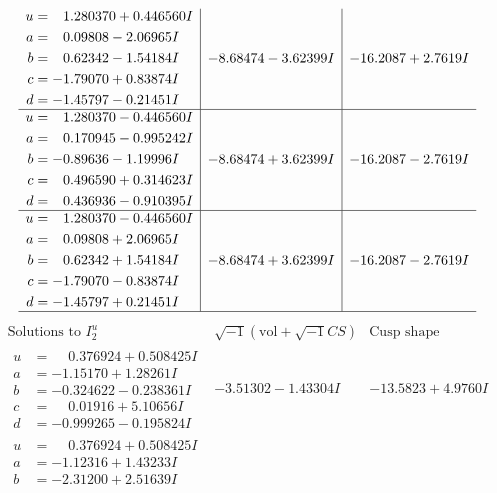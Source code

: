\documentclass[1p]{elsarticle_modified}
\theoremstyle{definition}
\newcommand{\I}{\sqrt{-1}}
\begin{document}
$$\begin{array}{c|c|c}
\begin{aligned}
u &= \phantom{-}1.280370 + 0.446560 I \\
a &= \phantom{-}0.09808 - 2.06965 I \\
b &= \phantom{-}0.62342 - 1.54184 I \\
c &= -1.79070 + 0.83874 I \\
d &= -1.45797 - 0.21451 I\end{aligned}
 & -8.68474 - 3.62399 I & -16.2087 + 2.7619 I \\ \hline\begin{aligned}
u &= \phantom{-}1.280370 - 0.446560 I \\
a &= \phantom{-}0.170945 - 0.995242 I \\
b &= -0.89636 - 1.19996 I \\
c &= \phantom{-}0.496590 + 0.314623 I \\
d &= \phantom{-}0.436936 - 0.910395 I\end{aligned}
 & -8.68474 + 3.62399 I & -16.2087 - 2.7619 I \\ \hline\begin{aligned}
u &= \phantom{-}1.280370 - 0.446560 I \\
a &= \phantom{-}0.09808 + 2.06965 I \\
b &= \phantom{-}0.62342 + 1.54184 I \\
c &= -1.79070 - 0.83874 I \\
d &= -1.45797 + 0.21451 I\end{aligned}
 & -8.68474 + 3.62399 I & -16.2087 - 2.7619 I\\
 \hline 
 \end{array}$$\newpage$$\begin{array}{c|c|c}  
\text{Solutions to }I^u_{2}& \I (\text{vol} + \sqrt{-1}CS) & \text{Cusp shape}\\
 \hline 
\begin{aligned}
u &= \phantom{-}0.376924 + 0.508425 I \\
a &= -1.15170 + 1.28261 I \\
b &= -0.324622 - 0.238361 I \\
c &= \phantom{-}0.01916 + 5.10656 I \\
d &= -0.999265 - 0.195824 I\end{aligned}
 & -3.51302 - 1.43304 I & -13.5823 + 4.9760 I \\ \hline\begin{aligned}
u &= \phantom{-}0.376924 + 0.508425 I \\
a &= -1.12316 + 1.43233 I \\
b &= -2.31200 + 2.51639 I \\

\end{aligned}
\end{array}$$
\end{document}

